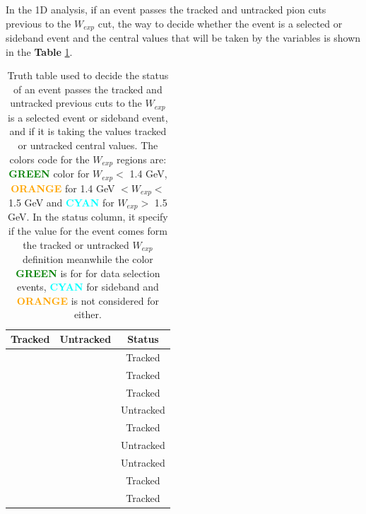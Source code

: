 In the 1D analysis, if an event passes the tracked and untracked pion cuts previous to the $W_{exp}$ cut, the way to decide whether the event is a selected or sideband event and the central values that will be taken by the variables is shown in the \textbf{Table} \ref{tab:Analysis:BgStudies:SidebandTunning:WTruthTable}.


\begin{table}[!htb]
	
	\centering

	\begin{tabular}{c|c|c}
        Tracked           & Untracked         & Status \\ \hline
		\cellcolor{green} & \cellcolor{green} & \cellcolor{green} Tracked \\ \hline
		\cellcolor{green} & \cellcolor{orange} & \cellcolor{green} Tracked\\ \hline
  		\cellcolor{green} & \cellcolor{cyan} & \cellcolor{green} Tracked\\ \hline
		\cellcolor{orange} & \cellcolor{green} & \cellcolor{green} Untracked\\ \hline
  		\cellcolor{orange} & \cellcolor{orange} & \cellcolor{orange} Tracked\\ \hline
		\cellcolor{orange} & \cellcolor{cyan} & \cellcolor{cyan} Untracked\\ \hline
  		\cellcolor{cyan} & \cellcolor{green} & \cellcolor{green} Untracked\\ \hline
		\cellcolor{cyan} & \cellcolor{orange} & \cellcolor{cyan} Tracked\\ \hline
  		\cellcolor{cyan} & \cellcolor{cyan} & \cellcolor{cyan} Tracked\\ \hline
	\end{tabular}

    \caption{Truth table used to decide the status of an event passes the tracked and untracked previous cuts to the $W_{exp}$ is a selected event or sideband event, and if it is taking the values tracked or untracked central values. The colors code for the $W_{exp}$ regions are: \textbf{\textcolor{green}{GREEN}} color for $W_{exp}<$ 1.4 GeV, \textbf{\textcolor{orange}{ORANGE}} for 1.4 GeV $<W_{exp}<$ 1.5 GeV and \textbf{\textcolor{cyan}{ CYAN}} for $W_{exp}>$ 1.5 GeV. In the status column, it specify if the value for the event comes form the tracked or untracked $W_{exp}$ definition meanwhile the color \textbf{\textcolor{green}{GREEN}} is for for data selection events, \textbf{\textcolor{cyan}{CYAN}} for sideband and \textbf{\textcolor{orange}{ORANGE}} is not considered for either.}
	\label{tab:Analysis:BgStudies:SidebandTunning:WTruthTable}
\end{table}

